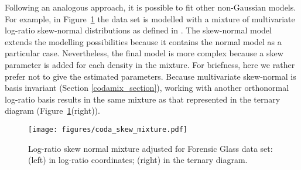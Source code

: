 \documentclass[12pt, a4paper]{article}
\theoremstyle{definition}
\begin{document}
Following an analogous approach, it is possible to fit other non-Gaussian models. For example, in Figure~\ref{skewcodadist} the data set is modelled with a mixture of multivariate log-ratio skew-normal distributions as defined in \cite{prates2013mixsmsn}. The skew-normal model extends the modelling possibilities because it contains the normal model as a particular case. Nevertheless, the final model is more complex because a skew parameter is added for each density in the mixture. For briefness, here we rather prefer not to give the estimated parameters. Because multivariate skew-normal is basis invariant  (Section \ref{codamix_section}), working with another orthonormal log-ratio basis results in the same mixture as that represented in the ternary diagram (Figure~\ref{skewcodadist}(right)). 

\begin{figure}[htbp]
\centering
\texttt{[image: figures/coda\_skew\_mixture.pdf]}\\%
\caption{Log-ratio skew normal mixture adjusted for Forensic Glass data set: (left) in log-ratio coordinates; (right) in the ternary diagram.}
\label{skewcodadist}
\end{figure}


% 
\end{document}
